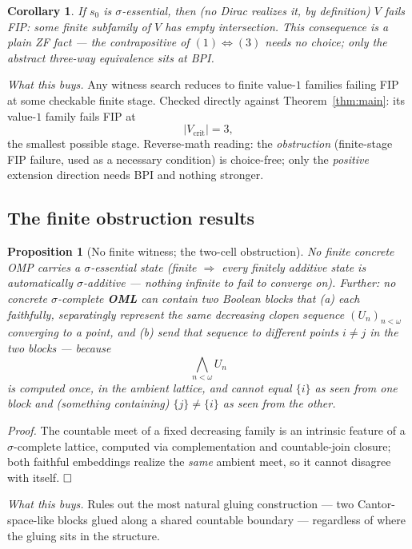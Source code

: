 \documentclass[11pt]{article}
\newtheorem{proposition}[theorem]{Proposition}
\newtheorem{corollary}[theorem]{Corollary}
\theoremstyle{remark}
\begin{document}
\begin{corollary}
\label{cor:stage3}
If $s_0$ is $\sigma$-essential, then (no Dirac realizes it, by definition)
$V$ fails FIP: some finite subfamily of $V$ has empty intersection. This
consequence is a plain ZF fact — the contrapositive of $(1)\Leftrightarrow(3)$
needs no choice; only the abstract three-way equivalence sits at BPI.
\end{corollary}

\emph{What this buys.} Any witness search reduces to finite value-$1$
families failing FIP at some checkable finite stage. Checked directly against
Theorem~\ref{thm:main}: its value-$1$ family fails FIP at
\[
  |V_{\text{crit}}| = 3,
\]
the smallest possible stage. Reverse-math reading: the \emph{obstruction}
(finite-stage FIP failure, used as a necessary condition) is choice-free;
only the \emph{positive} extension direction needs BPI and nothing stronger.

\subsection{The finite obstruction results}

\begin{proposition}[No finite witness; the two-cell obstruction]
\label{prop:finite-obstruction}
No finite concrete OMP carries a $\sigma$-essential state (finite $\Rightarrow$
every finitely additive state is automatically $\sigma$-additive — nothing
infinite to fail to converge on). Further: no concrete $\sigma$-complete
\textbf{OML} can contain two Boolean blocks that (a) each faithfully,
separatingly represent the same decreasing clopen sequence $(U_n)_{n<\omega}$
converging to a point, and (b) send that sequence to \emph{different} points
$i\neq j$ in the two blocks — because
\[
  \bigwedge_{n<\omega} U_n
\]
is computed once, in the ambient lattice, and cannot equal $\{i\}$ as seen
from one block and (something containing) $\{j\}\neq\{i\}$ as seen from the
other.
\end{proposition}

\emph{Proof.} The countable meet of a fixed decreasing family is an intrinsic
feature of a $\sigma$-complete lattice, computed via complementation and
countable-join closure; both faithful embeddings realize the \emph{same}
ambient meet, so it cannot disagree with itself. $\hfill\square$

\emph{What this buys.} Rules out the most natural gluing construction — two
Cantor-space-like blocks glued along a shared countable boundary — regardless
of where the gluing sits in the structure.
\end{document}
